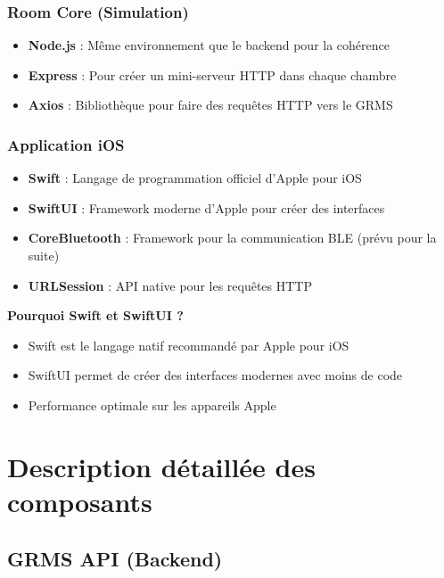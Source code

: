 \documentclass[11pt,a4paper]{article}
\begin{document}
\subsubsection{Room Core (Simulation)}

\begin{itemize}
    \item \textbf{Node.js} : Même environnement que le backend pour la cohérence
    \item \textbf{Express} : Pour créer un mini-serveur HTTP dans chaque chambre
    \item \textbf{Axios} : Bibliothèque pour faire des requêtes HTTP vers le GRMS
\end{itemize}

\subsubsection{Application iOS}

\begin{itemize}
    \item \textbf{Swift} : Langage de programmation officiel d'Apple pour iOS
    \item \textbf{SwiftUI} : Framework moderne d'Apple pour créer des interfaces
    \item \textbf{CoreBluetooth} : Framework pour la communication BLE (prévu pour la suite)
    \item \textbf{URLSession} : API native pour les requêtes HTTP
\end{itemize}

\textbf{Pourquoi Swift et SwiftUI ?}
\begin{itemize}
    \item Swift est le langage natif recommandé par Apple pour iOS
    \item SwiftUI permet de créer des interfaces modernes avec moins de code
    \item Performance optimale sur les appareils Apple
\end{itemize}

\section{Description détaillée des composants}

\subsection{GRMS API (Backend)}
\end{document}
